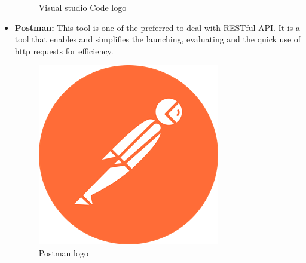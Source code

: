 \begin{itemize}
\begin{figure}[H]
                \caption{Visual studio Code logo } 
                \label{fig: Visual studio Code logo}
            \end{figure} 
    \item \textbf{Postman:} This tool is one of the preferred to deal with RESTful API. It is a tool that enables and simplifies the launching, evaluating and the quick use of http requests for efficiency.
        \begin{figure}[H] 
            \centering
            \includegraphics[scale=0.2]{logos/postman-logo.png}
            \caption{Postman logo} 
            \label{fig: Postman logo}
        \end{figure}
\end{itemize}

